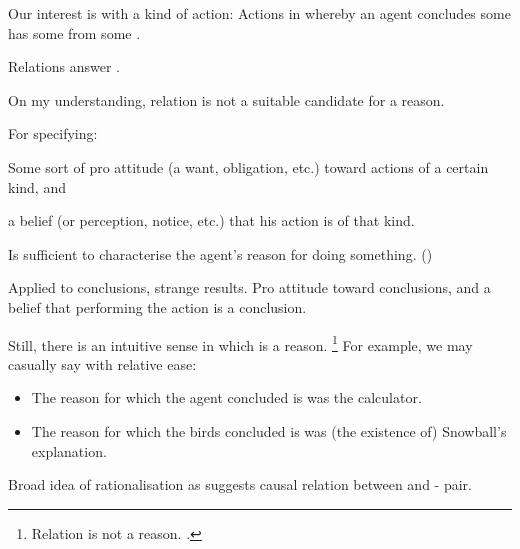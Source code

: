 \begin{note}
  Our interest is with a kind of action:
  Actions in whereby an agent concludes some  has some \val{} from some \pool{}.

  Relations answer \qWhy{}.

  On my understanding, relation is not a suitable candidate for a reason.

  For \citeauthor{Davidson:1963aa} specifying:
  \begin{enumerate*}[label=(\alph*), ref=(\alph*)]
  \item
    Some sort of pro attitude (a want, obligation, etc.) toward actions of a certain kind, and
  \item
    a belief (or perception, notice, etc.) that his action is of that kind.
  \end{enumerate*}
  Is sufficient to characterise the agent's reason for doing something.
  (\citeyear[Cf.][685,686]{Davidson:1963aa})

  Applied to conclusions, strange results.
  Pro attitude toward conclusions, and a belief that performing the action is a conclusion.

  Still, there is an intuitive sense in which \pool{} is a reason.%
  \footnote{
    Relation is not a reason.
    \citeauthor{Carroll:1895uj}.
  }
  For example, we may casually say with relative ease:

  \begin{itemize}[noitemsep]
  \item
    The reason for which the agent concluded \propM{\gistCalcEq{}} is  was the calculator.
  \item
    The reason for which the birds concluded  is  was (the existence of) Snowball's explanation.
  \end{itemize}

  Broad idea of rationalisation as \cExpl{} suggests causal relation between \pool{} and - pair.
\end{note}

